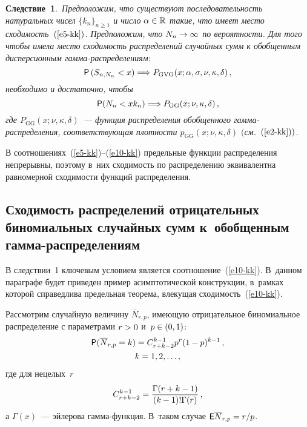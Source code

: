 \begin{multicols}{2}
\smallskip

\noindent
\textbf{Следствие~1}.\ \textit{Предположим, что существуют
последовательность натуральных чисел $\{k_n\}_{n\geqslant1}$ и число
$\alpha\hm\in\mathbb{R}$ такие, что имеет место сходимость~$(\ref{e5-kk})$.
Предположим, что $N_n\hm\to\infty$ по вероятности. Для того чтобы имела
место сходимость распределений случайных сумм к обобщенным
дисперсионным гам\-ма-рас\-пре\-де\-ле\-ниям$:$
\begin{equation}
{\sf P}\left(S_{n,N_n}<x\right)\Longrightarrow
P_{\mathrm{GVG}}(x;\alpha,\sigma,\nu,\kappa,\delta)\,,\label{e9-kk}
\end{equation}
необходимо и достаточно, чтобы
\begin{equation}
{\sf P}(N_n<xk_n)\Longrightarrow
P_{\mathrm{GG}}(x;\nu,\kappa,\delta)\,,\label{e10-kk}
\end{equation}
где $P_{\mathrm{GG}}(x;\nu,\kappa,\delta)$~--- функция распределения
обобщенного гам\-ма-рас\-пре\-де\-ле\-ния, соответствующая плотности
$p_{\mathrm{GG}}(x;\nu,\kappa,\delta)$ $($см.\ $(\ref{e2-kk}))$.}

\smallskip

В соотношениях~(\ref{e5-kk})--(\ref{e10-kk}) предельные функции распределения
непрерывны, поэтому в~них сходимость по распределению
эквивалентна равномерной сходимости функций распределения.

\subsection{Сходимость распределений отрицательных биномиальных
случайных сумм к~обобщенным гамма-распределениям}

В следствии~1 ключевым условием является соотношение~(\ref{e10-kk}). В~данном
параграфе будет приведен пример асимптотической конструкции, в~рамках
которой справедлива предельная теорема, влекущая сходимость~(\ref{e10-kk}).

Рассмотрим случайную величину $\overline N_{r,p}$, име\-ющую
отрицательное биномиальное распределение с параметрами $r\hm>0$ и~$p\hm\in(0,1)$:
\begin{multline}
{\sf P}(\overline N_{r,p}=k)=C_{r+k-2}^{k-1}p^r(1-p)^{k-1}\,,\\
k=1,2,\ldots,\label{e11-kk}
\end{multline}
где для нецелых~$r$
$$
C_{r+k-2}^{k-1}=\displaystyle\frac{\displaystyle \Gamma(r+k-1)\mathstrut}{\displaystyle (k-1)!\Gamma(r)\mathstrut}\,,
$$
а $\Gamma(x)$~--- эйлерова гам\-ма-функ\-ция. В~таком случае ${\sf
E}\overline N_{r,p}\hm=r/p$.


\end{multicols}
